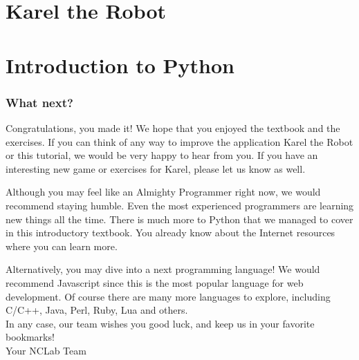 \documentclass[article,A4,12pt]{llncs}
\begin{document}
\part{Karel the Robot}



\part{Introduction to Python}



\section{What next?}

Congratulations, you made it! We hope that you enjoyed the textbook and the 
exercises. If you can think of any way to improve the application Karel the 
Robot or this tutorial, we would be very happy to hear from you. If you 
have an interesting new game or exercises for Karel, please let us know as well. 

Although you may feel like an Almighty Programmer right now, we would
recommend staying humble. Even the most experienced programmers are
learning new things all the time. There is much more to Python that 
we managed to cover in this introductory textbook. You already know 
about the Internet resources where you can learn more.  

Alternatively, you may dive into a next programming language! We would 
recommend Javascript since this is the most popular language for web 
development. Of course there are many more languages to explore, including 
C/C++, Java, Perl, Ruby, Lua and others.\\

\noindent
In any case, our team wishes you good luck, and keep us in your 
favorite bookmarks! \\

\hbox{} \hfill{} Your NCLab Team
\end{document}
